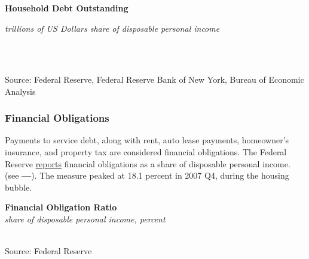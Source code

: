 \documentclass{report}
\makeatletter
\newcommand{\tbllink}[1]{\href{https://raw.githubusercontent.com/bdecon/US-chartbook/master/chartbook/data/#1}{\faTable}}
\newcommand*\short[1]{\expandafter\@gobbletwo\number\numexpr#1\relax}
\newcommand{\shdateaxisticks}{
		date coordinates in=x, axis line style={draw=none},
		xmax={2021-02-01},
		max space between ticks=40,	    
		xtick={{1990-01-01}, {1995-01-01}, {2000-01-01}, 
			{2005-01-01}, {2010-01-01}, {2015-01-01}, {2020-01-01}},
		minor xtick={},
		enlarge y limits={0.06}, enlarge x limits={0.01},
		}
\newcommand{\stdline}[4]{\addplot[very thick, no markers, color=#1] 
		table [x=#2, y=#3, col sep=comma] {#4};	}
\newcommand{\rbars}{
		\fill[color=black!10] (axis cs:{1990-07-01},\pgfkeysvalueof{/pgfplots/ymin}) rectangle 
			(axis cs:{1991-03-01}, \pgfkeysvalueof{/pgfplots/ymax});
		\fill[color=black!10] (axis cs:{2007-12-01},\pgfkeysvalueof{/pgfplots/ymin}) rectangle 
			(axis cs:{2009-07-01}, \pgfkeysvalueof{/pgfplots/ymax});
		\fill[color=black!10] (axis cs:{2001-03-01},\pgfkeysvalueof{/pgfplots/ymin}) rectangle 
			(axis cs:{2001-11-01}, \pgfkeysvalueof{/pgfplots/ymax});}
\makeatother
\begin{document}
{{{{\begin{minipage}{0.76\textwidth}
 \\

 \\

\vspace{1mm}

\noindent \normalsize \textbf{Household Debt Outstanding}\\
\footnotesize{\textit{trillions of US Dollars \hspace{46mm} share of disposable personal income}\\ \vspace{4mm}
\noindent {} \setlength{\tabcolsep}{3.1pt} \color{black!90}
		{\renewcommand{\arraystretch}{1.54}
		 \begin{tabular}{p{36mm} R{11.8mm} R{11.8mm}  R{8.0mm} R{7.4mm} R{7.4mm} 
		   R{7.4mm} R{7.4mm}}
			 
			 \hline
		\end{tabular}
		}	\\}
		
\vspace{-3.5mm}
\footnotesize{Source: Federal Reserve, Federal Reserve Bank of New York, Bureau of Economic Analysis}
\end{minipage}
\vspace{2mm}

\subsubsection*{\color{black!70} \seriffont Financial Obligations}
\vspace{-1mm}
\begin{minipage}{0.32\textwidth}
\small Payments to service debt, along with rent, auto lease payments, homeowner's insurance, and property tax are considered financial obligations. The Federal Reserve \href{https://www.federalreserve.gov/releases/housedebt/default.htm}{reports} financial obligations as a share of disposable personal income.   (see {\color{blue!80!black}\textbf{---}}). The measure peaked at 18.1 percent in 2007 Q4, during the housing bubble.
\end{minipage}\hspace{8mm}
\begin{minipage}{0.44\textwidth}
\noindent \normalsize \textbf{Financial Obligation Ratio}\\
\footnotesize{\textit{share of disposable personal income, percent}}\\
\noindent \hspace*{-2mm} \\
\footnotesize{Source: Federal Reserve} \hspace{25mm} \tbllink{for.csv} 


\end{minipage}}}}}
\end{document}
